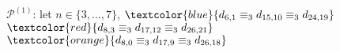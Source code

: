 
\begin{figure}[p]

    \noindent{}

    \captionsetup{singlelinecheck=off}
    \caption[.]{$\mathcal{P}^{(1)}$: let $n\in\lbrace3,\ldots,7\rbrace$,
        \footnotesize{
        $\textcolor{blue}{d_{6,1}\equiv_{3}d_{15,10}\equiv_{3}d_{24,19}}$
        $\textcolor{red}{d_{8,3}\equiv_{3}d_{17,12}\equiv_{3}d_{26,21}}$
        $\textcolor{orange}{d_{8,0}\equiv_{3}d_{17,9}\equiv_{3}d_{26,18}}$ 
        }}

    \label{fig:pascal-multiples-over-antidiagonal}

\end{figure}
